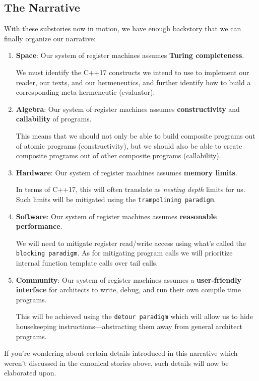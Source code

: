 \documentclass[twoside]{article}
\newcommand{\strong}[1]{{\bfseries #1}}
\begin{document}
\subsection*{The Narrative}

With these substories now in motion, we have enough backstory that we can finally organize our narrative:

\begin{enumerate}
\item \strong{Space}: Our system of register machines assumes \strong{Turing completeness}.

We must identify the C++17 constructs we intend to use to implement our reader, our texts, and our hermeneutics,
and further identify how to build a corresponding meta-hermeneutic (evaluator).
\item \strong{Algebra}: Our system of register machines assumes \strong{constructivity} and \strong{callability} of programs.

This means that we should not only be able to build composite programs out of atomic programs (constructivity), but we should
also be able to create composite programs out of other composite programs (callability).
\item \strong{Hardware}: Our system of register machines assumes \strong{memory limits}.

In terms of C++17, this will often translate as \emph{nesting depth} limits for us. Such limits will be mitigated using
the \texttt{trampolining paradigm}.
\item \strong{Software}: Our system of register machines assumes \strong{reasonable performance}.

We will need to mitigate register read/write access using what's called the \texttt{blocking paradigm}. As for mitigating
program calls we will prioritize internal function template calls over tail calls.
\item \strong{Community}: Our system of register machines assumes a \strong{user-friendly interface} for architects to write,
debug, and run their own compile time programs.

This will be achieved using the \texttt{detour paradigm} which will allow us to hide housekeeping instructions---abstracting
them away from general architect programs.
\end{enumerate}
If you're wondering about certain details introduced in this narrative which weren't discussed in the canonical stories
above, such details will now be elaborated upon.
\end{document}
